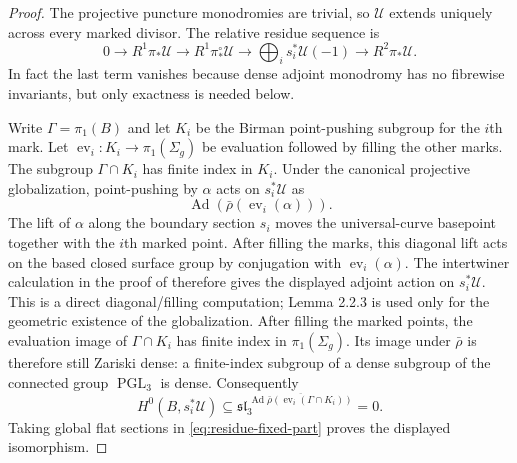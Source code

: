 \documentclass[11pt]{article}
\theoremstyle{definition}
\newcommand{\Ucal}{\mathcal U}
\newcommand{\PGL}{\operatorname{PGL}}
\begin{document}
\begin{proof}
The projective puncture monodromies are trivial, so $\Ucal$ extends uniquely
across every marked divisor.  The relative residue sequence is
\begin{equation}
 0\longrightarrow R^1\pi_*\Ucal
 \longrightarrow R^1\pi_*^\circ\Ucal
 \longrightarrow\bigoplus_i s_i^*\Ucal(-1)
 \longrightarrow R^2\pi_*\Ucal.
 \label{eq:residue-fixed-part}
\end{equation}
In fact the last term vanishes because dense adjoint monodromy has no
fibrewise invariants, but only exactness is needed below.

Write $\Gamma=\pi_1(B)$ and let $K_i$ be the Birman point-pushing subgroup
for the $i$th mark.  Let
$\operatorname{ev}_i:K_i\to\pi_1(\Sigma_g)$ be evaluation followed by filling
the other marks.  The subgroup $\Gamma\cap K_i$ has finite index in $K_i$.
Under the canonical projective globalization, point-pushing by $\alpha$ acts
on $s_i^*\Ucal$ as
\[
 \operatorname{Ad}\!\left(\bar\rho(\operatorname{ev}_i(\alpha))\right).
\]
The lift of $\alpha$ along the boundary section $s_i$ moves the
universal-curve basepoint together with the $i$th marked point.  After filling
the marks, this diagonal lift acts on the based closed surface group by
conjugation with $\operatorname{ev}_i(\alpha)$.  The intertwiner calculation
in the proof of \cite[Lemma 2.2.2]{LLCan} therefore gives the displayed
adjoint action on $s_i^*\Ucal$.  This is a direct diagonal/filling computation;
Lemma 2.2.3 is used only for the geometric existence of the globalization.
After filling the marked points, the
evaluation image of $\Gamma\cap K_i$ has finite index in
$\pi_1(\Sigma_g)$.  Its image
under $\bar\rho$ is therefore still Zariski dense: a finite-index subgroup
of a dense subgroup of the connected group $\PGL_3$ is dense.  Consequently
\[
 H^0(B,s_i^*\Ucal)
 \subseteq
 \mathfrak{sl}_3^{\,\overline{\operatorname{Ad}\bar\rho(
 \operatorname{ev}_i(\Gamma\cap K_i))}}=0.
\]
Taking global flat sections in \eqref{eq:residue-fixed-part} proves the
displayed isomorphism.


\end{proof}
\end{document}
